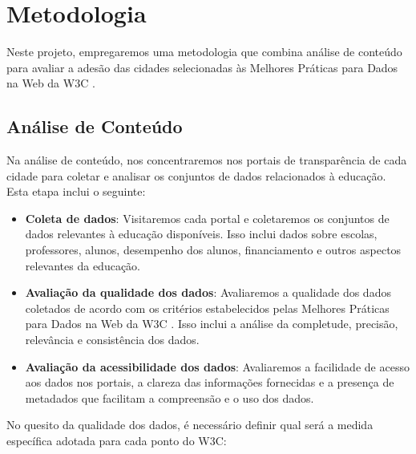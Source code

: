 \chapter{Metodologia}

Neste projeto, empregaremos uma metodologia que combina análise de conteúdo para avaliar a adesão das cidades selecionadas às Melhores Práticas para Dados na Web da W3C \cite{W3C}.

\section{Análise de Conteúdo}

Na análise de conteúdo, nos concentraremos nos portais de transparência de cada cidade para coletar e analisar os conjuntos de dados relacionados à educação. Esta etapa inclui o seguinte:

\begin{itemize}
    \item \textbf{Coleta de dados}: Visitaremos cada portal \cite{SP} \cite{CU} \cite{SA} \cite{MA} \cite{CG} e coletaremos os conjuntos de dados relevantes à educação disponíveis. Isso inclui dados sobre escolas, professores, alunos, desempenho dos alunos, financiamento e outros aspectos relevantes da educação.
    \item \textbf{Avaliação da qualidade dos dados}: Avaliaremos a qualidade dos dados coletados de acordo com os critérios estabelecidos pelas Melhores Práticas para Dados na Web da W3C \cite{W3CSUMMARY}. Isso inclui a análise da completude, precisão, relevância e consistência dos dados.
    \item \textbf{Avaliação da acessibilidade dos dados}: Avaliaremos a facilidade de acesso aos dados nos portais, a clareza das informações fornecidas e a presença de metadados que facilitam a compreensão e o uso dos dados.
\end{itemize}

No quesito da qualidade dos dados, é necessário definir qual será a medida específica adotada para cada ponto do W3C:

